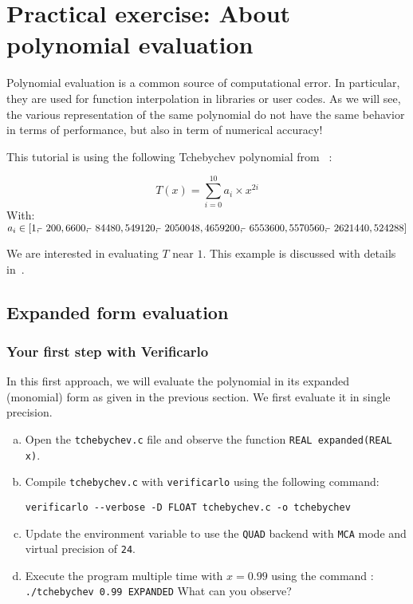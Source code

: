 \section{Practical exercise: About polynomial evaluation}

Polynomial evaluation is a common source of computational error. In particular, they are used for function interpolation in libraries or user codes. As we will see, the various representation of the same polynomial do not have the same behavior in terms of performance, but also in term of numerical accuracy!

This tutorial is using the following Tchebychev polynomial from ~\cite[pp.52-54]{parker1997monte}:

$$T(x)=\sum_{i=0}^{10}{a_i \times x^{2i}}$$
With:
$a_i \in [
  1,
  \matminus 200,
  6600,
  \matminus 84480,
  549120,
  \matminus 2050048,
  4659200,
  \matminus 6553600,
  5570560,
  \matminus 2621440,
  524288
]$

We are interested in evaluating  $T$ near $1$.
This example is discussed with details in~\cite[pp.52-54]{parker1997monte}.

\subsection{Expanded form evaluation}

\subsubsection{Your first step with Verificarlo}

In this first approach, we will evaluate the polynomial in its expanded (monomial) form as given in the previous section. %
We first evaluate it in single precision.

\begin{question}
  \begin{enumerate}[(a)]
  \item Open the {\tt tchebychev.c} file and observe the function {\tt REAL expanded(REAL x)}.

  \item Compile {\tt tchebychev.c} with {\tt verificarlo} using the following command:

    {\tt verificarlo -{}-verbose -D FLOAT tchebychev.c -o tchebychev}

  \item Update the environment variable to use the {\tt QUAD} backend with {\tt MCA} mode and virtual precision of {\tt 24}.
  \item Execute the program multiple time with  $x=0.99$ using the command : \newline
{\tt ./tchebychev 0.99 EXPANDED} \newline
What can you observe?
  \end{enumerate}
\end{question}



